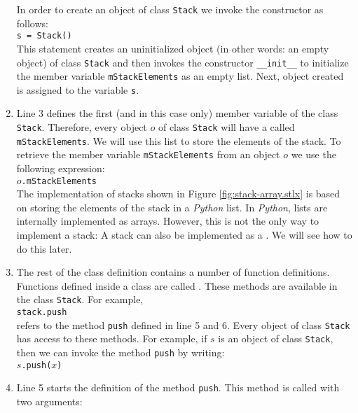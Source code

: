 \begin{enumerate}
      In order to create an object of class \texttt{Stack} we invoke the constructor as follows:
      \\[0.2cm]
      \hspace*{1.3cm}
      \texttt{s = Stack()}
      \\[0.2cm]
      This statement creates an uninitialized object (in other words: an empty object) of class \texttt{Stack}
      and then invokes the constructor \texttt{\_\_init\_\_} to initialize the member variable
      \texttt{mStackElements} as an empty list.  Next, object created is assigned to the variable \texttt{s}.
\item Line 3 defines the first (and in this case only) member variable of the class \texttt{Stack}.
      Therefore, every object $o$ of class \texttt{Stack} will have a  
      called
      \texttt{mStackElements}. 
      We will use this list to store the elements of the stack.  To retrieve the member variable
      \texttt{mStackElements} from an object $o$ we use the following expression:
      \\[0.2cm]
      \hspace*{1.3cm}
      $o$\texttt{.mStackElements}
      \\[0.2cm]
      The implementation of stacks shown
      in Figure \ref{fig:stack-array.stlx} is based on storing the elements of the stack in a
      \textsl{Python} list.  In \textsl{Python}, lists are internally implemented as arrays.  However,
      this is not the only way to implement a stack: A stack can also be implemented as a .
      We will see how to do this later.
\item The rest of the class definition contains a number of function definitions.  Functions defined inside
      a class are called .  These methods are available in the class
      \texttt{Stack}.  For example, 
      \\[0.2cm]
      \hspace*{1.3cm}
      \texttt{stack.push}
      \\[0.2cm]
      refers to the method \texttt{push} defined in line 5 and 6. Every object of class
      \texttt{Stack} has access to these 
      methods.  For example, if $s$ is an object of class \texttt{Stack}, then we can invoke the
      method \texttt{push} by writing:
      \\[0.2cm]
      \hspace*{1.3cm}
      $s$\texttt{.push($x$)}
\item Line 5 starts the definition of the method \texttt{push}.  This method is called with two arguments:

\end{enumerate}
